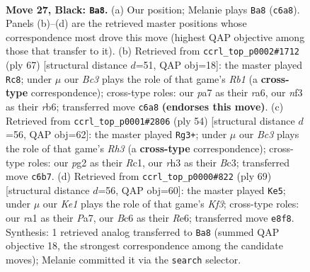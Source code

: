 \documentclass[11pt]{article}
\begin{document}
\clearpage

\begin{figure}[p]\centering
\begin{subfigure}{0.46\textwidth}\centering
\resizebox{\linewidth}{!}{%
\newchessgame
\chessboard[
  setfen={4k2r/P4p2/2b3pn/4P3/8/5NKR/4r1P1/RN6 b k - 0 27},
  showmover=false,
  pgfstyle=straightmove, color=movearrow, markmove={c6-a8}
]}
\caption{}
\end{subfigure}\hfill
\begin{subfigure}{0.46\textwidth}\centering
\resizebox{\linewidth}{!}{%
\newchessgame
\chessboard[
  setfen={1r4k1/5rp1/RR5p/6b1/8/5N1P/5PP1/6K1 b - - 2 34},
  showmover=false,
  pgfstyle=straightmove, color=movearrow, markmove={b8-c8}
]}
\caption{}
\end{subfigure}
\\[4pt]
\begin{subfigure}{0.46\textwidth}\centering
\resizebox{\linewidth}{!}{%
\newchessgame
\chessboard[
  setfen={r6r/ppp3k1/5n2/3P4/2P1p3/2B2p1R/P4P2/2R1K3 w - - 1 28},
  showmover=false,
  pgfstyle=straightmove, color=movearrow, markmove={h3-g3}
]}
\caption{}
\end{subfigure}\hfill
\begin{subfigure}{0.46\textwidth}\centering
\resizebox{\linewidth}{!}{%
\newchessgame
\chessboard[
  setfen={7r/p4p2/4rk2/2P5/8/2R1Nn2/PP3P1p/2K4R b - - 15 35},
  showmover=false,
  pgfstyle=straightmove, color=movearrow, markmove={f6-e5}
]}
\caption{}
\end{subfigure}
\caption{\textbf{Move 27, Black: \texttt{Ba8}.} (a) Our position; Melanie plays \texttt{Ba8} (\texttt{c6a8}). Panels (b)--(d) are the retrieved master positions whose correspondence most drove this move (highest QAP objective among those that transfer to it). (b) Retrieved from \texttt{ccrl\_top\_p0002\#1712} (ply 67) [structural distance $d$=51, QAP obj=18]: the master played \texttt{Rc8}; under $\mu$ our \emph{Bc3} plays the role of that game's \emph{Rb1} (a \textbf{cross-type} correspondence); cross-type roles: our \emph{p}a7 as their \emph{r}a6, our \emph{n}f3 as their \emph{r}b6; transferred move \texttt{c6a8} \textbf{(endorses this move)}. (c) Retrieved from \texttt{ccrl\_top\_p0001\#2806} (ply 54) [structural distance $d$=56, QAP obj=62]: the master played \texttt{Rg3+}; under $\mu$ our \emph{Bc3} plays the role of that game's \emph{Rh3} (a \textbf{cross-type} correspondence); cross-type roles: our \emph{p}g2 as their \emph{R}c1, our \emph{r}h3 as their \emph{B}c3; transferred move \texttt{c6b7}. (d) Retrieved from \texttt{ccrl\_top\_p0000\#822} (ply 69) [structural distance $d$=56, QAP obj=60]: the master played \texttt{Ke5}; under $\mu$ our \emph{Ke1} plays the role of that game's \emph{Kf3}; cross-type roles: our \emph{r}a1 as their \emph{P}a7, our \emph{B}c6 as their \emph{R}e6; transferred move \texttt{e8f8}. Synthesis: 1 retrieved analog transferred to \texttt{Ba8} (summed QAP objective 18, the strongest correspondence among the candidate moves); Melanie committed it via the \texttt{search} selector.}
\label{fig:thought-m53}
\end{figure}
\end{document}
